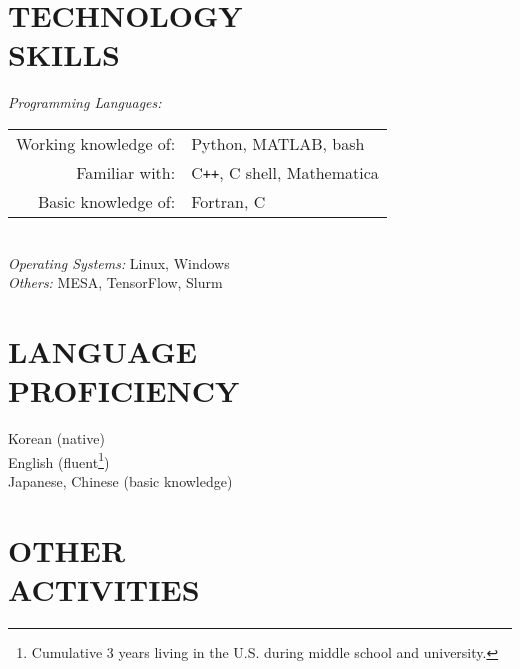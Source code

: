 \documentclass[margin, 10pt]{res} %
\begin{document}
\begin{resume}

\section{TECHNOLOGY \\ SKILLS} 

{\sl Programming Languages:}\\%
\begin{tabular}{rl}
    Working knowledge of:& Python, MATLAB, bash\\
    Familiar with:& C\texttt{++}, C shell, Mathematica\\
     Basic knowledge of:& Fortran, C \\
\end{tabular}\\
{\sl Operating Systems:} Linux, Windows \\
{\sl Others:} MESA, TensorFlow, Slurm\\
 
\section{LANGUAGE \\ PROFICIENCY} 

Korean (native) \\
English (fluent\footnote{Cumulative 3 years living in the U.S. during middle school and university.}) \\
Japanese, Chinese (basic knowledge) \\
 


\section{OTHER \\ ACTIVITIES} 


\end{resume}
\end{document}
